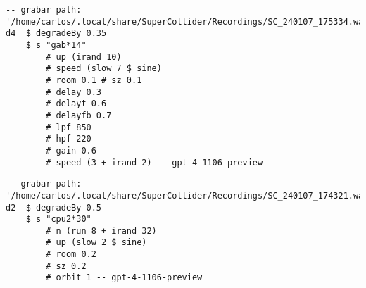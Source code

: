 \begin{minipage}[t]{1\textwidth}
    \centering
    \begin{lstlisting}[style=SuperCollider-IDE, language=ExtendedHaskell, basicstyle=\footnotesize\ttfamily, numbers=none]
-- grabar path: '/home/carlos/.local/share/SuperCollider/Recordings/SC_240107_175334.wav'
d4  $ degradeBy 0.35 
    $ s "gab*14" 
        # up (irand 10) 
        # speed (slow 7 $ sine) 
        # room 0.1 # sz 0.1 
        # delay 0.3 
        # delayt 0.6 
        # delayfb 0.7 
        # lpf 850
        # hpf 220 
        # gain 0.6
        # speed (3 + irand 2) -- gpt-4-1106-preview                         
    \end{lstlisting}
    \vspace{1cm}
\end{minipage}




\begin{minipage}[t]{1\textwidth}
    \centering
    \begin{lstlisting}[style=SuperCollider-IDE, language=ExtendedHaskell, basicstyle=\footnotesize\ttfamily, numbers=none]
-- grabar path: '/home/carlos/.local/share/SuperCollider/Recordings/SC_240107_174321.wav'
d2  $ degradeBy 0.5 
    $ s "cpu2*30" 
        # n (run 8 + irand 32) 
        # up (slow 2 $ sine) 
        # room 0.2 
        # sz 0.2 
        # orbit 1 -- gpt-4-1106-preview                      
    \end{lstlisting}
    \vspace{1cm}
\end{minipage}





